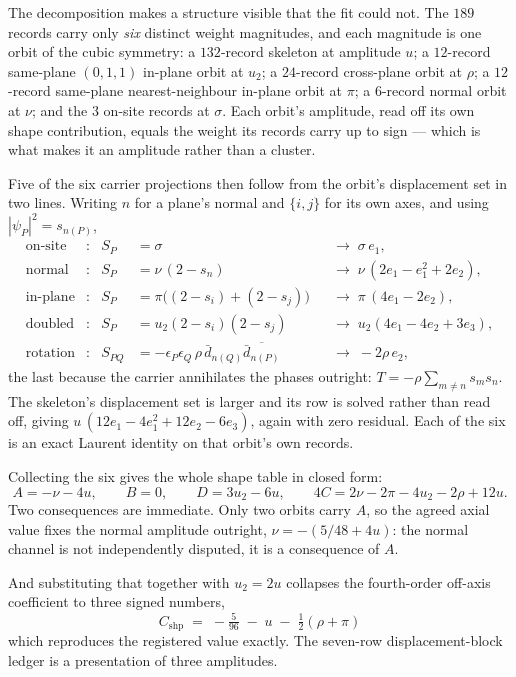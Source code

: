 \documentclass[11pt]{article}
\theoremstyle{plain}
\theoremstyle{definition}
\theoremstyle{remark}
\newcommand{\chk}[1]{}
\begin{document}
The decomposition makes a structure visible that the fit could not. The $189$
records carry only \emph{six} distinct weight magnitudes, and each magnitude is
one orbit of the cubic symmetry: a $132$-record skeleton at amplitude $u$; a
$12$-record same-plane $(0,1,1)$ in-plane orbit at $u_2$; a $24$-record
cross-plane orbit at $\rho$; a $12$-record same-plane nearest-neighbour in-plane
orbit at $\pi$; a $6$-record normal orbit at $\nu$; and the $3$ on-site records
at $\sigma$. Each orbit's amplitude, read off its own shape contribution, equals
the weight its records carry up to sign --- which is what makes it an amplitude
rather than a cluster.
\chk{the 189 records carry exactly six weight magnitudes}

Five of the six carrier projections then follow from the orbit's displacement
set in two lines. Writing $n$ for a plane's normal and $\{i,j\}$ for its own
axes, and using $|\psi_P|^2=s_{n(P)}$,
\[
\begin{aligned}
  \text{on-site} &: &S_P&=\sigma
     &&\longrightarrow\;\sigma\,e_1,\\
  \text{normal} &: &S_P&=\nu\,(2-s_n)
     &&\longrightarrow\;\nu\,(2e_1-e_1^{2}+2e_2),\\
  \text{in-plane} &: &S_P&=\pi\bigl((2-s_i)+(2-s_j)\bigr)
     &&\longrightarrow\;\pi\,(4e_1-2e_2),\\
  \text{doubled} &: &S_P&=u_2(2-s_i)(2-s_j)
     &&\longrightarrow\;u_2(4e_1-4e_2+3e_3),\\
  \text{rotation} &: &S_{PQ}&=-\epsilon_P\epsilon_Q\,\rho\,
        \bar d_{n(Q)}\overline{\bar d_{n(P)}}
     &&\longrightarrow\;-2\rho\,e_2,
\end{aligned}
\]
the last because the carrier annihilates the phases outright:
$T=-\rho\sum_{m\neq n}s_ms_n$. The skeleton's displacement set is larger and its
row is solved rather than read off, giving $u\,(12e_1-4e_1^{2}+12e_2-6e_3)$,
again with zero residual. Each of the six is an exact Laurent identity on that
orbit's own records.
\chk{every orbit's carrier projection is closed form in e1, e2, e3}

Collecting the six gives the whole shape table in closed form:
\[
  A=-\nu-4u,\qquad B=0,\qquad D=3u_2-6u,\qquad
  4C=2\nu-2\pi-4u_2-2\rho+12u .
\]
Two consequences are immediate. Only two orbits carry $A$, so the agreed axial
value fixes the normal amplitude outright, $\nu=-(5/48+4u)$: the normal channel
is not independently disputed, it is a consequence of $A$.
\chk{A = 5/48 forces the normal amplitude: nu = -(5/48 + 4u)}
And substituting that together with $u_2=2u$ collapses the fourth-order
off-axis coefficient to three signed numbers,
\[
  \boxed{\;C_{\mathrm{shp}}\;=\;-\tfrac{5}{96}\;-\;u\;-\;\tfrac{1}{2}(\rho+\pi)\;}
\]
which reproduces the registered value exactly. The seven-row displacement-block
ledger is a presentation of three amplitudes.
\chk{C\_shp = -5/96 - u - (rho + pi)/2, exactly}
\end{document}
